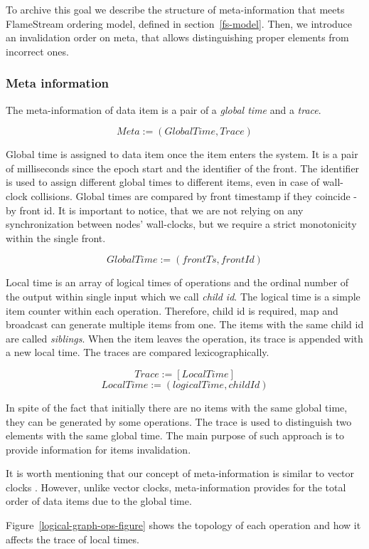 To archive this goal we describe the structure of meta-information that meets FlameStream ordering model, defined in section~\ref{fs-model}. Then, we introduce an invalidation order on meta, that allows distinguishing proper elements from incorrect ones.

\subsubsection{Meta information}
The meta-information of data item is a pair of a {\it global time} and a {\it trace}.

\[Meta := (GlobalTime, Trace)\]

Global time is assigned to data item once the item enters the system. It is a pair of milliseconds since the epoch start and the identifier of the front. The identifier is used to assign different global times to different items, even in case of wall-clock collisions. Global times are compared by front timestamp if they coincide - by front id. It is important to notice, that we are not relying on any synchronization between nodes' wall-clocks, but we require a strict monotonicity within the single front.

\[GlobalTime := (frontTs, frontId)\]

Local time is an array of logical times of operations and the ordinal number of the output within single input which we call {\it child id}. The logical time is a simple item counter within each operation. Therefore, child id is required, map and broadcast can generate multiple items from one. The items with the same child id are called {\it siblings}. When the item leaves the operation, its trace is appended with a new local time. The traces are compared lexicographically.

\[Trace := [LocalTime]\]
\[LocalTime := (logicalTime, childId)\]

In spite of the fact that initially there are no items with the same global time, they can be generated by some operations. The trace is used to distinguish two elements with the same global time. The main purpose of such approach is to provide information for items invalidation. 

It is worth mentioning that our concept of meta-information is similar to vector clocks
\cite{fidge1988timestamps, mattern88virtualtime}. However, unlike vector clocks, meta-information provides for the total order of data items due to the global time.

Figure~\ref{logical-graph-ops-figure} shows the topology of each operation and how it affects the trace of local times.

